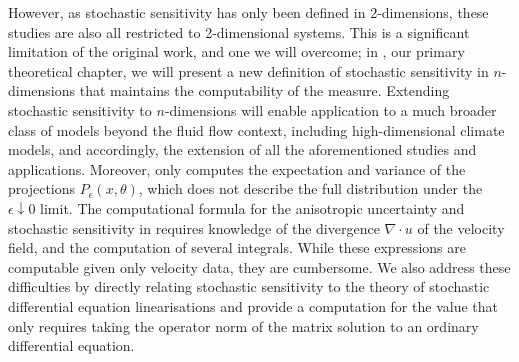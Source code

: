 However, as stochastic sensitivity has only been defined in 2-dimensions, these studies are also all restricted to 2-dimensional systems.
This is a significant limitation of the original work, and one we will overcome; in , our primary theoretical chapter, we will present a new definition of stochastic sensitivity in \(n\)-dimensions that maintains the computability of the measure.
Extending stochastic sensitivity to \(n\)-dimensions will enable application to a much broader class of models beyond the fluid flow context, including high-dimensional climate models, and accordingly, the extension of all the aforementioned studies and applications.
Moreover, \citet{Balasuriya_2020_StochasticSensitivityComputable} only computes the expectation and variance of the projections \(P_\epsilon(x,\theta)\), which does not describe the full distribution under the \(\epsilon\downarrow 0\) limit.
The computational formula for the anisotropic uncertainty and stochastic sensitivity in  requires knowledge of the divergence \(\nabla\cdot u\) of the velocity field, and the computation of several integrals.
While these expressions are computable given only velocity data, they are cumbersome.
We also address these difficulties by directly relating stochastic sensitivity to the theory of stochastic differential equation linearisations and provide a computation for the value that only requires taking the operator norm of the matrix solution to an ordinary differential equation.
